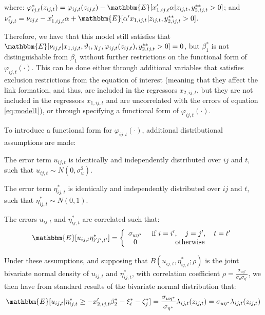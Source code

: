 \noindent where: $\varphi_{ij,t}^*(z_{ij,t}) = \varphi_{ij,t}(z_{ij,t}) - \mathbbm{E}[ x_{1,ij,t}'\alpha \rvert z_{ij,t}, y_{2,i j,t}^{**} > 0]$; and $\nu_{ij,t}^* = \nu_{ij,t} - x_{1,ij,t}'\alpha + \mathbbm{E}[\alpha' x_{1,ij,t} \rvert z_{ij,t}, y_{2,i j,t}^{**} > 0]$.

Therefore, we have that this model still satisfies that $\mathbbm{E}[\nu_{ij,t} \rvert x_{1,ij,t}, \vartheta_i, \chi_j, \\ \varphi_{ij,t}(z_{ij,t}), y_{2,i j,t}^{**} > 0] = 0$, but $\beta_1^*$ is not distinguishable from $\beta_1$ without further restrictions on the functional form of $\varphi_{ij,t}(\cdot)$. This can be done either through additional variables that satisfies exclusion restrictions from the equation of interest (meaning that they affect the link formation, and thus, are included in the regressors $x_{2,ij,t}$, but they are not included in the regressors $x_{1,ij,t}$ and are uncorrelated with the errors of equation \ref{eq:model1}), or through specifying a functional form of $\varphi_{ij,t}(\cdot)$.  

To introduce a functional form for $\varphi_{ij,t}(\cdot)$, additional distributional assumptions are made:
\begin{assumption} \label{assumption_heckman_2}
    The error term $u_{ij,t}$ is identically and independently distributed over $ij$ and $t$, such that $u_{ij,t} \sim N(0, \sigma_u^2)$.
\end{assumption}
\begin{assumption} \label{assumption_heckman_3}
    The error term $\eta_{ij,t}^*$ is identically and independently distributed over $ij$ and $t$, such that $\eta_{ij,t}^* \sim N(0, 1)$.
\end{assumption}
\begin{assumption} \label{assumption_heckman_4}
    The errors $u_{ij,t}$ and $\eta_{ij,t}^*$ are correlated such that:
    \begin{align*}
    \mathbbm{E} [u_{ij,t} \eta^*_{i' j',t'}] =\left\{\begin{array}{cc}
\sigma_{u\eta^*} & \text { if } i=i', \quad j=j', \quad t=t' \\
0 & \text { otherwise }
\end{array}\right.
\end{align*}
\end{assumption}

Under these assumptions, and supposing that $B(u_{ij,t}, \eta^*_{ij,t}; \rho)$ is the joint bivariate normal density of $u_{ij,t}$ and $\eta^*_{ij,t}$, with correlation coefficient $\rho = \frac{\sigma_{u\eta^*}}{\sigma_u \sigma_{\eta^*}}$, we then have from standard results of the bivariate normal distribution that:
\begin{align}
    \mathbbm{E} [u_{ij,t} \rvert \eta^*_{i j,t} \geq -x_{2,ij,t}'{\beta_2^*}  -\xi_{i}^*-\zeta_{j}^*] = \frac{\sigma_{u\eta^*}}{\sigma_{\eta^*}} \lambda_{ij,t}(z_{ij,t}) = \sigma_{u\eta^*} \lambda_{ij,t}(z_{ij,t})
\end{align}

